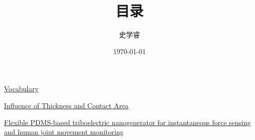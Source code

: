 \documentclass[UTF8]{ctexart}
\begin{document}
    

\title{目录}
\author{史学睿}
\date{\today}
\maketitle

\href{Vocabulary/Vocabulary.pdf}{Vocabulary}

\href{First/First.pdf}{Influence of Thickness and Contact Area}

\href{Second/Second.pdf}{Flexible PDMS-based triboelectric nanogenerator for instantaneous force sensing and human joint movement monitoring}
\end{document}
